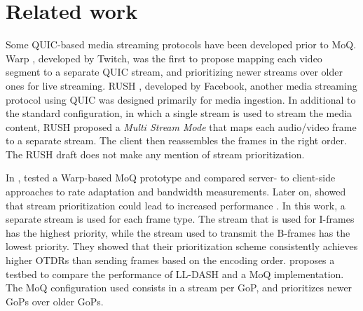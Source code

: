 
\chapter{Related work}\label{chapter:related_work}

Some QUIC-based media streaming protocols have been developed prior to \ac{MoQ}. Warp \parencite{curleyWarpSegmentedLive2022}, developed by Twitch, was the first to propose mapping each video segment to a separate QUIC stream, and prioritizing newer streams over older ones for live streaming. RUSH \parencite{puginRUSHReliableUnreliable2021}, developed by Facebook, another media streaming protocol using QUIC was designed primarily for media ingestion. In additional to the standard configuration, in which a single stream is used to stream the media content, RUSH proposed a \textit{Multi Stream Mode} that maps each audio/video frame to a separate stream. The client then reassembles the frames in the right order. The RUSH draft does not make any mention of stream prioritization. %

In \parencite{gurelMediaQUICInitial2023}, \citeauthor{gurelMediaQUICInitial2023} tested a Warp-based MoQ prototype and compared server- to client-side approaches to rate adaptation and bandwidth measurements. Later on, \citeauthor{gurelThisWayPrioritization2024} showed that stream prioritization could lead to increased performance \parencite{gurelIBC2023TechPapers, gurelThisWayPrioritization2024}. In this work, a separate stream is used for each frame type. The stream that is used for I-frames has the highest priority, while the stream used to transmit the B-frames has the lowest priority. They showed that their prioritization scheme consistently achieves higher \ac{OTDR}s than sending frames based on the encoding order. \parencite{gurelMediaoverQUICTransportVs2024} proposes a testbed to compare the performance of LL-DASH and a MoQ implementation. The MoQ configuration used consists in a stream per GoP, and prioritizes newer GoPs over older GoPs.

